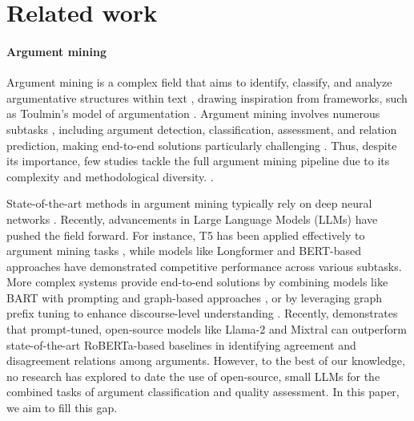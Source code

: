 \section{Related work}
\label{sec:litreview}
    \paragraph{Argument mining}%
    Argument mining is a complex field that aims to identify, classify, and analyze argumentative structures within text \cite{lawrence2020argument}, drawing inspiration from frameworks, such as Toulmin's model of argumentation \cite{toulmin2003uses}. Argument mining involves numerous subtasks \cite{arora2023argument}, including argument detection, classification, assessment, and relation prediction, making end-to-end solutions particularly challenging \cite{cabrio2018five}. Thus, despite its importance, few studies tackle the full argument mining pipeline due to its complexity and methodological diversity. \cite{cao2023autoam, bao2022generative, morio2022end}.

     State-of-the-art methods in argument mining typically rely on deep neural networks \cite{arora2023argument}. Recently, advancements in Large Language Models (LLMs) have pushed the field forward. For instance, T5 \cite{raffel2020exploring} has been applied effectively to argument mining tasks \cite{kawarada2024argument}, while models like Longformer \cite{ding2023score} and BERT-based approaches \cite{kashefi2023argument} have demonstrated competitive performance across various subtasks. More complex systems provide end-to-end solutions by combining models like BART \cite{lewis2019bart} with prompting and graph-based approaches \cite{sun2024pita}, or by leveraging graph prefix tuning to enhance discourse-level understanding \cite{sun2024discourse}. Recently, \citet{gorur2024can} demonstrates that prompt-tuned, open-source models like Llama-2 \cite{touvron2023llama} and Mixtral \cite{jiang2024mixtral} can outperform state-of-the-art RoBERTa-based baselines \cite{ruiz2021transformer} in identifying agreement and disagreement relations among arguments. However, to the best of our knowledge, no research has explored to date the use of open-source, small LLMs for the combined tasks of argument classification and quality assessment. In this paper, we aim to fill this gap. 
    

